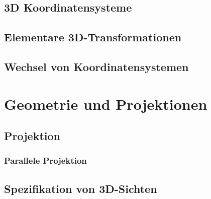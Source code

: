 \documentclass{scrreprt}
\begin{document}
\section{3D Koordinatensysteme}

\section{Elementare 3D-Transformationen}

\section{Wechsel von Koordinatensystemen}

\chapter{Geometrie und Projektionen}

\section{Projektion}
\subsection{Parallele Projektion}

\section{Spezifikation von 3D-Sichten}
\end{document}
